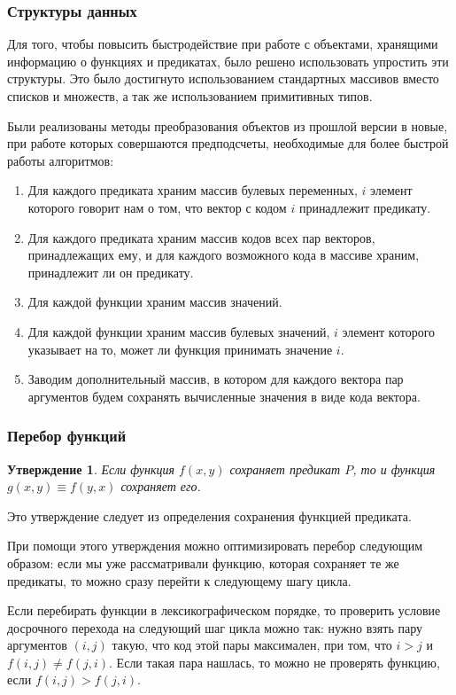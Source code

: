\documentclass[a4paper,14pt]{extreport}
\newtheorem{utv}{Утверждение}
\begin{document}
\subsubsection{Структуры данных}
Для того, чтобы повысить быстродействие при работе с объектами, хранящими информацию о функциях и предикатах, было решено использовать упростить эти структуры. Это было достигнуто использованием стандартных массивов вместо списков и множеств, а так же использованием примитивных типов.

Были реализованы методы преобразования объектов из прошлой версии в новые, при работе которых совершаются предподсчеты, необходимые для более быстрой работы алгоритмов:
\begin{enumerate}
\item Для каждого предиката храним массив булевых переменных, $i$ элемент которого говорит нам о том, что вектор с кодом $i$ принадлежит предикату. 
\item Для каждого предиката храним массив кодов всех пар векторов, принадлежащих ему, и для каждого возможного кода в массиве храним, принадлежит ли он предикату.
\item Для каждой функции храним массив значений. 
\item Для каждой функции храним массив булевых значений, $i$ элемент которого указывает на то, может ли функция принимать значение $i$. 
\item Заводим дополнительный массив, в котором для каждого вектора пар аргументов будем сохранять вычисленные значения в виде кода вектора. 
\end{enumerate} 

\subsubsection{Перебор функций}
\begin{utv}
Если функция $f(x, y)$ сохраняет предикат $P$, то и функция $g(x, y) \equiv f(y, x)$ сохраняет его.
\end{utv}
Это утверждение следует из определения сохранения функцией предиката.

При помощи этого утверждения можно оптимизировать перебор следующим образом: если мы уже рассматривали функцию, которая сохраняет те же предикаты, то можно сразу перейти к следующему шагу цикла.

Если перебирать функции в лексикографическом порядке, то проверить условие досрочного перехода на следующий шаг цикла можно так: нужно взять пару аргументов $(i, j)$ такую, что код этой пары максимален, при том, что $i > j$ и $f(i, j) \neq f(j, i)$. Если такая пара нашлась, то можно не проверять функцию, если $f(i, j) > f(j, i)$.
\end{document}
